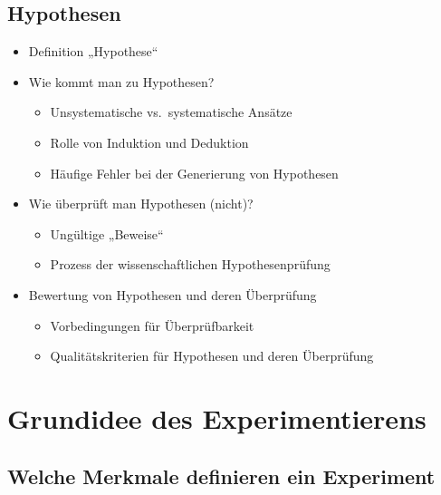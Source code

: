 \documentclass[
]{book}
\providecommand{\tightlist}{%
  \setlength{\itemsep}{0pt}\setlength{\parskip}{0pt}}
\begin{document}
\hypertarget{hypothesen-3}{%
\subsection{Hypothesen}\label{hypothesen-3}}

\begin{itemize}
\tightlist
\item
  Definition „Hypothese``
\item
  Wie kommt man zu Hypothesen?

  \begin{itemize}
  \tightlist
  \item
    Unsystematische vs.~systematische Ansätze
  \item
    Rolle von Induktion und Deduktion
  \item
    Häufige Fehler bei der Generierung von Hypothesen
  \end{itemize}
\item
  Wie überprüft man Hypothesen (nicht)?

  \begin{itemize}
  \tightlist
  \item
    Ungültige „Beweise``
  \item
    Prozess der wissenschaftlichen Hypothesenprüfung
  \end{itemize}
\item
  Bewertung von Hypothesen und deren Überprüfung

  \begin{itemize}
  \tightlist
  \item
    Vorbedingungen für Überprüfbarkeit
  \item
    Qualitätskriterien für Hypothesen und deren Überprüfung
  \end{itemize}
\end{itemize}

\hypertarget{grundidee-des-experimentierens}{%
\section{Grundidee des Experimentierens}\label{grundidee-des-experimentierens}}

\hypertarget{welche-merkmale-definieren-ein-experiment}{%
\subsection{Welche Merkmale definieren ein Experiment}\label{welche-merkmale-definieren-ein-experiment}}
\end{document}
